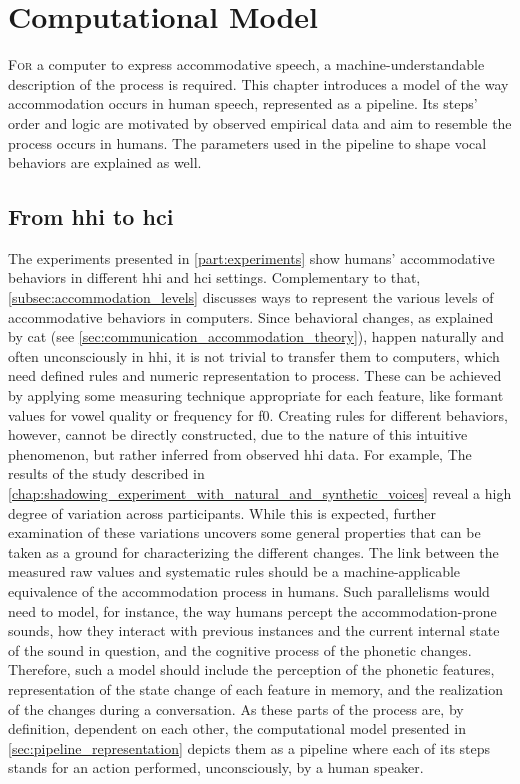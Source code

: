 \chapter[Computational Model]{Computational Model}
\label{chap:computational_model}

\lettrine{F}{or} a computer to express accommodative speech, a machine-understandable description of the process is required.
This chapter introduces a model of the way accommodation occurs in human speech, represented as a pipeline.
Its steps' order and logic are motivated by observed empirical data and aim to resemble the process occurs in humans.
The parameters used in the pipeline to shape vocal behaviors are explained as well.

\pagebreak

\section{From \acs{hhi} to \acs{hci}}
\label{sec:from_hhi_to_hci}

The experiments presented in \cref{part:experiments} show humans' accommodative behaviors in different \ac{hhi} and \ac{hci} settings.
Complementary to that, \cref{subsec:accommodation_levels} discusses ways to represent the various levels of accommodative behaviors in computers.
Since behavioral changes, as explained by \ac{cat} (see \cref{sec:communication_accommodation_theory}), happen naturally and often unconsciously in \ac{hhi}, it is not trivial to transfer them to computers, which need defined rules and numeric representation to process.
These can be achieved by applying some measuring technique appropriate for each feature, like formant values for vowel quality or frequency for \ac{f0}.
Creating rules for different behaviors, however, cannot be directly constructed, due to the nature of this intuitive phenomenon, but rather inferred from observed \ac{hhi} data.
For example, The results of the study described in \cref{chap:shadowing_experiment_with_natural_and_synthetic_voices} reveal a high degree of variation across participants.
While this is expected, further examination of these variations uncovers some general properties that can be taken as a ground for characterizing the different changes.
The link between the measured raw values and systematic rules should be a machine-applicable equivalence of the accommodation process in humans.
Such parallelisms would need to model, for instance, the way humans percept the accommodation-prone sounds, how they interact with previous instances and the current internal state of the sound in question, and the cognitive process of the phonetic changes.
Therefore, such a model should include the perception of the phonetic features, representation of the state change of each feature in memory, and the realization of the changes during a conversation.
As these parts of the process are, by definition, dependent on each other, the computational model presented in \cref{sec:pipeline_representation} depicts them as a pipeline where each of its steps stands for an action performed, unconsciously, by a human speaker.

